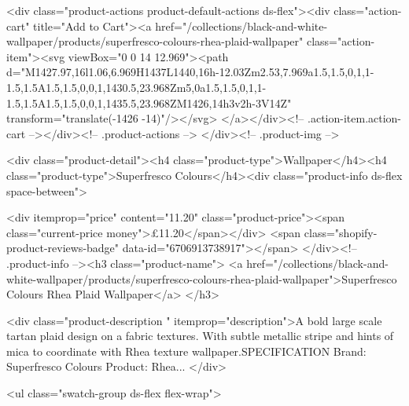 {{{{{{{<div class="product-actions product-default-actions ds-flex"><div class="action-cart" title="Add to Cart"><a href="/collections/black-and-white-wallpaper/products/superfresco-colours-rhea-plaid-wallpaper" class="action-item"><svg viewBox="0 0 14 12.969"><path d="M1427.97,16l1.06,6.969H1437L1440,16h-12.03Zm2.53,7.969a1.5,1.5,0,1,1-1.5,1.5A1.5,1.5,0,0,1,1430.5,23.968Zm5,0a1.5,1.5,0,1,1-1.5,1.5A1.5,1.5,0,0,1,1435.5,23.968ZM1426,14h3v2h-3V14Z" transform="translate(-1426 -14)"/></svg>
</a></div><!-- .action-item.action-cart --></div><!-- .product-actions -->
</div><!-- .product-img -->

<div class="product-detail"><h4 class="product-type">Wallpaper</h4><h4 class="product-type">Superfresco Colours</h4><div class="product-info ds-flex space-between">
    
<div itemprop="price" content="11.20" class="product-price"><span class="current-price money">£11.20</span></div>
    <span class="shopify-product-reviews-badge" data-id="6706913738917"></span>
  </div><!-- .product-info --><h3 class="product-name">
      <a href="/collections/black-and-white-wallpaper/products/superfresco-colours-rhea-plaid-wallpaper">Superfresco Colours Rhea Plaid Wallpaper</a>
    </h3>
    
<div class="product-description " itemprop="description">A bold large scale tartan plaid design on a fabric textures. With subtle metallic stripe and hints of mica to coordinate with Rhea texture wallpaper.SPECIFICATION Brand: Superfresco Colours Product: Rhea...
</div>



<ul class="swatch-group ds-flex flex-wrap">
        
}}}}}}}
